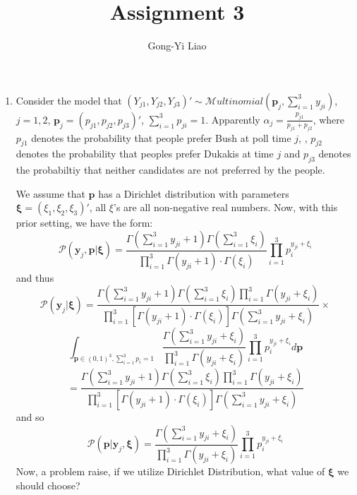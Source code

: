 \documentclass[twoside,11pt]{amsart}
\author{Gong-Yi Liao}
\title{Assignment 3}
\begin{document}
\maketitle

\begin{enumerate}
\item
  Consider the model that $(Y_{j1}, Y_{j2}, Y_{j3})'\sim\mathcal
  Multinomial(\bm p_j, \sum_{i=1}^3y_{ji})$, $j=1,2$, $\bm p_j = (p_{j1}, p_{j2},
  p_{j3})'$, $\sum_{i=1}^3p_{ji} = 1$. Apparently $\alpha_j =
  \frac{p_{j1}}{p_{j1}+p_{j2}}$, 
  where $p_{j1}$ denotes the probability that people prefer Bush at
  poll time $j$, , $p_{j2}$ denotes the probability that peoples
  prefer Dukakis at time $j$ and $p_{j3}$ denotes the probabiltiy that
  neither candidates are not preferred by the people. 

  We assume that $\bm p$ has a Dirichlet distribution with parameters
  $\bm\xi = (\xi_1, \xi_2, \xi_3)'$, all $\xi$'s are
  all non-negative real numbers.
  Now, with this prior setting, we have the form:
  \[
  \mathscr P(\bm y_j, \bm p|\bm\xi) =
  \frac{\Gamma\left(\sum_{i=1}^3y_{ji}+1\right)\Gamma\left(\sum_{i=1}^3\xi_i\right)}{\prod_{i=1}^3\Gamma(y_{ji}+1)\cdot\Gamma(\xi_i)}\prod_{i=1}^3p_i^{y_{ji} + \xi_i}
  \]
  and thus
  \[
  \mathscr P(\bm y_j|\bm\xi) = 
  \frac{\Gamma\left(\sum_{i=1}^3y_{ji}+1\right)\Gamma\left(\sum_{i=1}^3\xi_i\right)\prod_{i=1}^3\Gamma(y_{ji}+\xi_i)}
  {\prod_{i=1}^3\left[\Gamma(y_{ji}+1)\cdot\Gamma(\xi_i)\right]\Gamma\left(\sum_{i=1}^3y_{ji}+\xi_i\right)}\times
  \]
  \[
  \int_{\bm p\in (0,1)^3, \sum_{i=1}^3 p_i=1}
  \frac{\Gamma\left(\sum_{i=1}^3y_{ji}+\xi_i\right)}{\prod_{i=1}^3\Gamma(y_{ji}+\xi_i)}
  \prod_{i=1}^3p_i^{y_{ji} + \xi_i}d\bm p
  \]
  \[
  =\frac{\Gamma\left(\sum_{i=1}^3y_{ji}+1\right)\Gamma\left(\sum_{i=1}^3\xi_i\right)\prod_{i=1}^3\Gamma(y_{ji}+\xi_i)}
  {\prod_{i=1}^3\left[\Gamma(y_{ji}+1)\cdot\Gamma(\xi_i)\right]\Gamma\left(\sum_{i=1}^3y_{ji}+\xi_i\right)}
  \]
  and so
  \[
  \mathscr P(\bm p|\bm y_j,\bm\xi) =   \frac{\Gamma\left(\sum_{i=1}^3y_{ji}+\xi_i\right)}{\prod_{i=1}^3\Gamma(y_{ji}+\xi_i)}
  \prod_{i=1}^3p_i^{y_{ji} + \xi_i}
  \]
  Now, a problem raise, if we utilize Dirichlet Distribution, what
  value of $\bm\xi$ we should choose? 
  


\end{enumerate}
\end{document}
